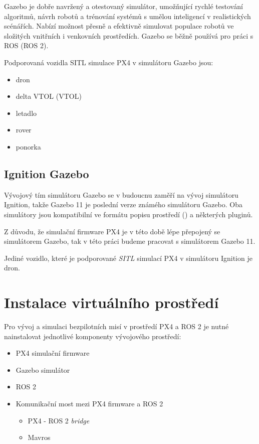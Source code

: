 Gazebo je dobře navržený a otestovaný simulátor, umožňující rychlé testování algoritmů, návrh robotů a trénování systémů s umělou inteligencí v realistických scénářích. Nabízí možnost přesně a efektivně simulovat populace robotů ve složitých vnitřních i venkovních prostředích. Gazebo se běžně používá pro práci s ROS (ROS 2).  \cite{ROSROBOT}

Podporovaná vozidla \acs{SITL} simulace PX4 v simulátoru Gazebo jsou: \cite{GAZ}

\begin{itemize}
    \item dron
    \item delta \acs{VTOL} (\acl{VTOL})
    \item letadlo
    \item rover
    \item ponorka
\end{itemize}

\subsection{Ignition Gazebo}

Vývojový tím simulátoru Gazebo se v budoucnu zaměří na vývoj simulátoru Ignition, takže Gazebo 11 je poslední verze známého simulátoru Gazebo. Oba simulátory jsou kompatibilní ve formátu popisu prostředí () a některých pluginů. \cite{IGN}

Z důvodu, že simulační firmware PX4 je v této době lépe přepojený se simulátorem Gazebo, tak v této práci budeme pracovat s simulátorem Gazebo 11.

Jediné vozidlo, které je podporované \textit{\acl{SITL}} simulací PX4 v simulátoru Ignition je dron.

\section{Instalace virtuálního prostředí}

Pro vývoj a simulaci bezpilotních misí v prostředí PX4 a ROS 2 je nutné nainstalovat jednotlivé komponenty vývojového prostředí:

\begin{itemize}
    \item PX4 simulační firmware
    \item Gazebo simulátor
    \item ROS 2 
    \item Komunikační most mezi PX4 firmware a ROS 2
    \begin{itemize}
        \item PX4 - ROS 2 \textit{bridge}
        \item Mavros\\
    \end{itemize}
\end{itemize}

